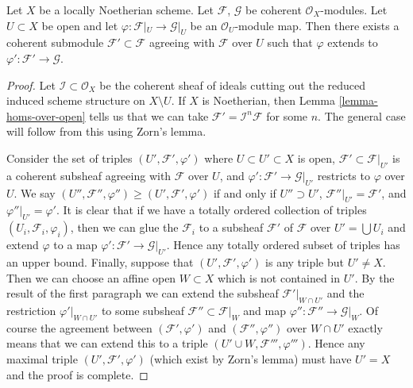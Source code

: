 \begin{lemma}
\label{lemma-extend-coherent}
Let $X$ be a locally Noetherian scheme. Let $\mathcal{F}$, $\mathcal{G}$
be coherent $\mathcal{O}_X$-modules. Let $U \subset X$ be open and
let $\varphi : \mathcal{F}|_U \to \mathcal{G}|_U$ be an
$\mathcal{O}_U$-module map. Then there exists a coherent
submodule $\mathcal{F}' \subset \mathcal{F}$ agreeing with
$\mathcal{F}$ over $U$ such that $\varphi$ extends to
$\varphi' : \mathcal{F}' \to \mathcal{G}$.
\end{lemma}

\begin{proof}
Let $\mathcal{I} \subset \mathcal{O}_X$ be the coherent sheaf of ideals
cutting out the reduced induced scheme structure on $X \setminus U$.
If $X$ is Noetherian, then Lemma \ref{lemma-homs-over-open} tells us that
we can take $\mathcal{F}' = \mathcal{I}^n\mathcal{F}$
for some $n$. The general case will follow from this using Zorn's lemma.

\medskip\noindent
Consider the set of triples $(U', \mathcal{F}', \varphi')$ where
$U \subset U' \subset X$ is open, $\mathcal{F}' \subset \mathcal{F}|_{U'}$
is a coherent subsheaf agreeing with $\mathcal{F}$ over $U$, and
$\varphi' : \mathcal{F}' \to \mathcal{G}|_{U'}$ restricts to
$\varphi$ over $U$. We say
$(U'', \mathcal{F}'', \varphi'') \geq (U', \mathcal{F}', \varphi')$
if and only if $U'' \supset U'$, $\mathcal{F}''|_{U'} = \mathcal{F}'$,
and $\varphi''|_{U'} = \varphi'$.
It is clear that if we have a totally ordered collection
of triples $(U_i, \mathcal{F}_i, \varphi_i)$, then we
can glue the $\mathcal{F}_i$ to a subsheaf $\mathcal{F}'$ of $\mathcal{F}$
over $U' = \bigcup U_i$ and extend $\varphi$ to a map
$\varphi' : \mathcal{F}' \to \mathcal{G}|_{U'}$.
Hence any totally ordered subset of triples has an upper bound.
Finally, suppose that $(U', \mathcal{F}', \varphi')$
is any triple but $U' \not = X$. Then we can choose an
affine open $W \subset X$ which is not contained in $U'$.
By the result of the first paragraph we can extend
the subsheaf $\mathcal{F}'|_{W \cap U'}$ and the restriction
$\varphi'|_{W \cap U'}$ to some subsheaf $\mathcal{F}'' \subset \mathcal{F}|_W$
and map $\varphi'' : \mathcal{F}'' \to \mathcal{G}|_W$.
Of course the agreement between $(\mathcal{F}', \varphi')$ and
$(\mathcal{F}'', \varphi'')$ over $W \cap U'$ exactly means that
we can extend this to a triple $(U' \cup W, \mathcal{F}''', \varphi''')$.
Hence any maximal triple $(U', \mathcal{F}', \varphi')$
(which exist by Zorn's lemma) must have $U' = X$ and the
proof is complete.
\end{proof}